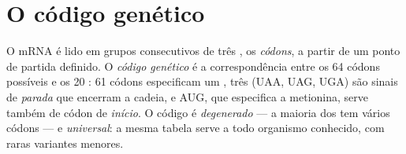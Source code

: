 \section{O código genético}

\begin{definition}\label{def:g11:gene-expression:code}
O mRNA é lido em grupos consecutivos de três , os
\emph{códons}, a partir de um ponto de partida definido. O
\emph{código genético} é a correspondência entre
os 64 códons possíveis e os 20 : 61 códons especificam um
, três (UAA, UAG, UGA) são sinais de \emph{parada} que
encerram a cadeia, e AUG, que especifica a metionina, serve também de
códon de \emph{início}. O código é \emph{degenerado} --- a maioria dos
 tem vários códons --- e \emph{universal}: a mesma tabela
serve a todo organismo conhecido, com raras variantes menores.
\end{definition}

